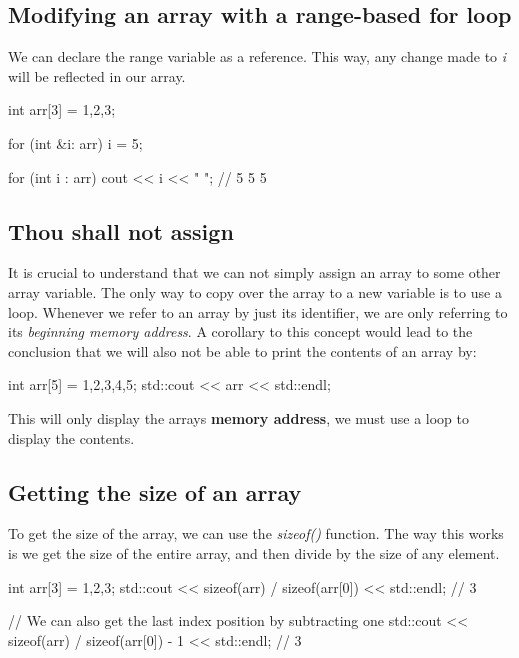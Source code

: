 \documentclass{report}
\begin{document}
   \subsection{Modifying an array with a range-based for loop}
   \bigbreak \noindent 
   We can declare the range variable as a reference. This way, any change made to \textit{i} will be reflected in our array.
   \bigbreak \noindent 
   
   \begin{cppcode}
int arr[3] = {1,2,3};

for (int &i: arr)  {
    i = 5;
}

for (int i : arr) cout << i << " "; // 5 5 5
   \end{cppcode}
   

   \bigbreak \noindent 
   \subsection{Thou shall not assign}
   \bigbreak \noindent 
   It is crucial to understand  that we can not simply assign an array to some other array variable. The only way to copy over the array to a new variable is to use a loop. Whenever we refer to an array by just its identifier, we are only referring to its \textit{beginning memory address}.
   \bigbreak \noindent 
   A corollary to this concept would lead to the conclusion that we will also not be able to print the contents of an array by:
   \bigbreak \noindent 
   
   \begin{cppcode}
int arr[5] = {1,2,3,4,5};
std::cout << arr << std::endl;

   \end{cppcode}
   
   \bigbreak \noindent 
   This will only display the arrays \textbf{memory address}, we must use a loop to display the contents.

   \pagebreak \bigbreak \noindent 
   \subsection{Getting the size of an array}
   \bigbreak \noindent 
   To get the size of the array, we can use the \textit{sizeof()} function. The way this works is we get the size of the entire array, and then divide by the size of any element.
   \bigbreak \noindent 
    
    \begin{cppcode}
int arr[3] = {1,2,3};
std::cout << sizeof(arr) / sizeof(arr[0]) << std::endl;  // 3

// We can also get the last index position by subtracting one
    std::cout << sizeof(arr) / sizeof(arr[0]) - 1 << std::endl;  // 3
    \end{cppcode}
    
\end{document}
